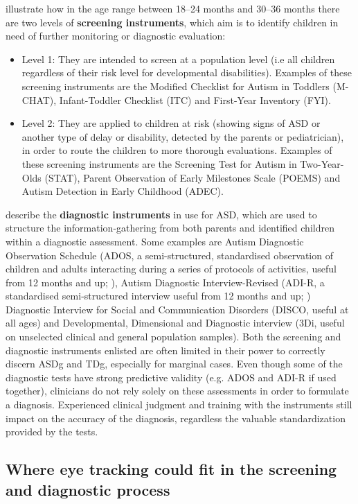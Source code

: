\cite{towie2016screening} illustrate how in the age range between 18–24 months and 30–36 months there are two levels of \textbf{screening instruments}, which aim is to identify children in need of further monitoring or diagnostic evaluation:
\begin{itemize}
    \item Level 1: They are intended to screen at a population level (i.e all children regardless of their risk level for developmental disabilities). Examples of these screening instruments are the Modified Checklist for Autism in Toddlers (M-CHAT), Infant-Toddler Checklist (ITC) and First-Year Inventory (FYI).
    \item Level 2: They are applied to children at risk (showing signs of ASD or another type of delay or disability, detected by the parents or pediatrician), in order to route the children to more thorough evaluations. Examples of these screening instruments are the Screening Test for Autism in Two-Year-Olds (STAT), Parent Observation of Early Milestones Scale (POEMS) and Autism Detection in Early Childhood (ADEC).
\end{itemize}
\cite{charman2013measuerement} describe the \textbf{diagnostic instruments} in use for ASD, which are used to structure the information-gathering from both parents and identified children within a diagnostic assessment. Some examples are Autism Diagnostic Observation Schedule (ADOS, a semi-structured, standardised observation of children and adults interacting during a series of protocols of activities, useful from 12 months and up; \citealp{lord2000ADOS}), Autism Diagnostic Interview-Revised (ADI-R, a standardised semi-structured interview useful from 12 months and up; \citealp{rutter2003ADI-R}) Diagnostic Interview for Social and Communication Disorders (DISCO, useful at all ages) and Developmental, Dimensional and Diagnostic interview (3Di, useful on unselected clinical and general population samples).
Both the screening and diagnostic instruments enlisted are often limited in their power to correctly discern ASDg and TDg, especially for marginal cases. Even though some of the diagnostic tests have strong predictive validity (e.g. ADOS and ADI-R if used together), clinicians do not rely solely on these assessments in order to formulate a diagnosis. Experienced clinical judgment and training with the instruments still impact on the accuracy of the diagnosis, regardless the valuable standardization provided by the tests. 


\subsection{Where eye tracking could fit in the screening and diagnostic process}
\label{sec:eyetrackingdiagnosis}

